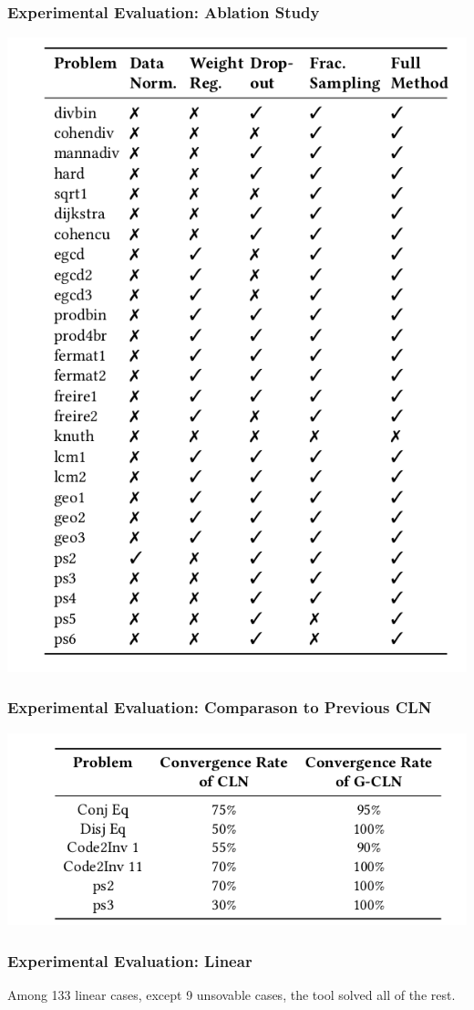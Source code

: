 \documentclass[11pt]{beamer}
\begin{document}
\begin{frame}\frametitle{Experimental Evaluation: Ablation Study}
\begin{center}
\includegraphics[scale=0.3]{13.png}
\end{center}
\end{frame}

\begin{frame}\frametitle{Experimental Evaluation: Comparason to Previous CLN}
\begin{center}
\includegraphics[scale=0.37]{14.png}
\end{center}
\end{frame}

\begin{frame}\frametitle{Experimental Evaluation: Linear}
Among 133 linear cases, except 9 unsovable cases, the tool solved all of the rest.
\end{frame}
\end{document}
